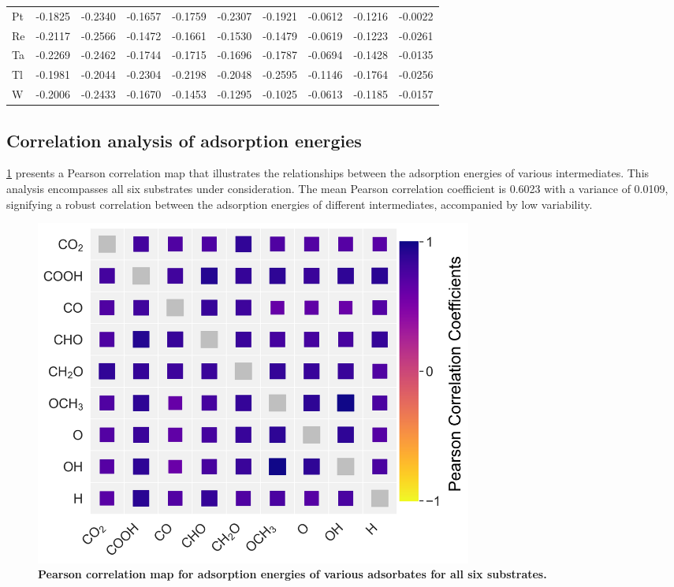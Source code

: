 \documentclass[a4paper, 12pt]{article}
\begin{document}
\begin{table}[htbp]
{\begin{tabular}{l *{9}{l}}
        Pt & -0.1825 & -0.2340 & -0.1657 & -0.1759 & -0.2307 & -0.1921 & -0.0612 & -0.1216 & -0.0022 \\
        Re & -0.2117 & -0.2566 & -0.1472 & -0.1661 & -0.1530 & -0.1479 & -0.0619 & -0.1223 & -0.0261 \\
        Ta & -0.2269 & -0.2462 & -0.1744 & -0.1715 & -0.1696 & -0.1787 & -0.0694 & -0.1428 & -0.0135 \\
        Tl & -0.1981 & -0.2044 & -0.2304 & -0.2198 & -0.2048 & -0.2595 & -0.1146 & -0.1764 & -0.0256 \\
        W  & -0.2006 & -0.2433 & -0.1670 & -0.1453 & -0.1295 & -0.1025 & -0.0613 & -0.1185 & -0.0157 \\
        \bottomrule
    \end{tabular}
  }
\end{table}

\subsection{Correlation analysis of adsorption energies}
\label{supp_sec2.4_corr_analysis}

\cref{supp_fig9:corr_eads} presents a Pearson correlation map that illustrates the relationships between the adsorption energies of various intermediates. This analysis encompasses all six substrates under consideration. The mean Pearson correlation coefficient is 0.6023 with a variance of 0.0109, signifying a robust correlation between the adsorption energies of different intermediates, accompanied by low variability.

\begin{figure}[htbp]
  \centering
  \includegraphics[width=0.7\textwidth]{supp_fig9_corr_eads.png}
  \caption{\textbf{Pearson correlation map for adsorption energies of various adsorbates for all six substrates.}}
  \label{supp_fig9:corr_eads}
\end{figure}
\end{document}
